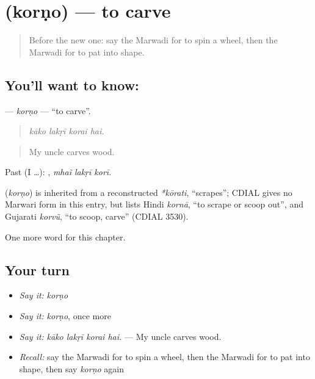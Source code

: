 \section[\texorpdfstring{\mw{कोरणो} (korṇo)}{कोरणो (korṇo)}]{ (korṇo) — to carve}

\label{lesson:MW-C281-korno}



\begin{quote}
Before the new one: say the Marwadi for to spin a wheel, then the Marwadi for to pat into shape.
\end{quote}

\subsection*{You'll want to know: }
\textbf{} — \emph{korṇo} — \textquotedblleft{}to carve\textquotedblright{}.

\begin{quote}
   
\end{quote}

\begin{quote}
\emph{kāko lakṛī korai hai.}
\end{quote}

\begin{quote}
My uncle carves wood.
\end{quote}

Past (I …):   , \emph{mhaĩ lakṛī korī}.

\begin{cousinweb}
\textbf{} (\emph{korṇo}) is inherited from a reconstructed \emph{*kōrati}, \textquotedblleft{}scrapes\textquotedblright{}; CDIAL gives no Marwari form in this entry, but lists Hindi \emph{kornā}, \textquotedblleft{}to scrape or scoop out\textquotedblright{}, and Gujarati \emph{korvũ}, \textquotedblleft{}to scoop, carve\textquotedblright{} (CDIAL 3530).
\end{cousinweb}

\begin{grammarlens}[title={What you've built}]
One more word for this chapter.
\end{grammarlens}

\subsection*{Your turn}
\begin{itemize}
\raggedright
  \item \emph{Say it:} \emph{korṇo}
  \item \emph{Say it:} \emph{korṇo}, once more
  \item \emph{Say it:} \emph{kāko lakṛī korai hai.} — My uncle carves wood.
  \item \emph{Recall:} say the Marwadi for to spin a wheel, then the Marwadi for to pat into shape, then say \emph{korṇo} again
\end{itemize}

